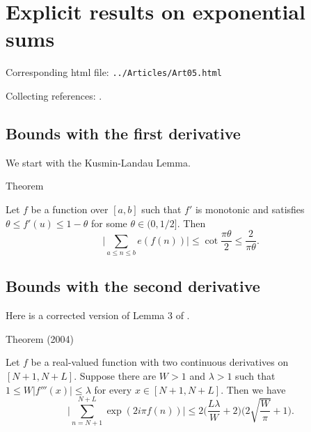 \chapter{   Explicit results on exponential sums}

Corresponding html file: \texttt{../Articles/Art05.html}










Collecting references:
\cite{Daboussi-Rivat*01}.



 
 


\par 
\section{Bounds with the first derivative}


We start with the Kusmin-Landau Lemma.
\par 
\begin{thm}{Theorem}

    Let $f$ be a function over $[a, b]$ such that $f'$ is monotonic
    and satisfies $\theta \le f'(u)\le 1-\theta$ for some $\theta
    \in(0,1/2]$. Then
    $$
    \biggl|\sum_{a\le n\le b} e(f(n))\biggr|
    \le
    \cot\frac{\pi\theta}{2}\le \frac{2}{\pi \theta}.
    $$
\end{thm}



\par 
\section{Bounds with the second derivative}


  Here is a corrected version of Lemma 3 of
  \cite{Cheng-Graham*04}.
\par 
\begin{thm}{Theorem (2004)}

  Let $f$ be a real-valued function with two continuous derivatives
  on $[N+1, N+L]$. Suppose there are $W > 1$ and $\lambda > 1$ such
  that $1 \le W |f'''(x)| \le \lambda$ for every $x\in [N+1,
  N+L]$. Then we have
  $$
  \biggl|\sum_{n= N+1}^{N+L}
  \exp( 2i\pi f(n)) \biggr|
  \le 2\biggl(\frac{L \lambda}{W} +2\biggr)
  \biggl(2\sqrt{\frac{W}{\pi}} + 1\biggr).
  $$
\end{thm}



